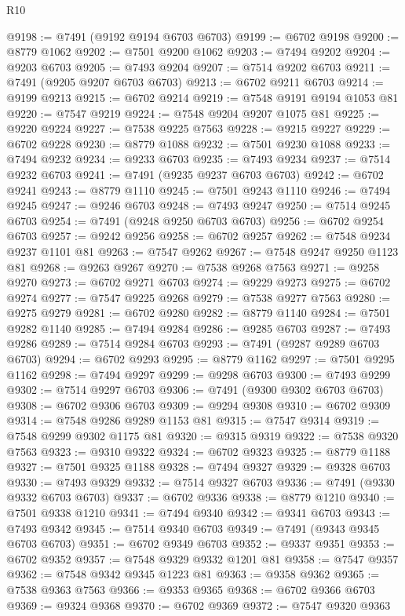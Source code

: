 \begin{lexlean}{R10}
\begin{coremodule}
{{{{{{{{{{{{{{{{{{{{{{{{{{{{{{{{{{{{{{{{{{{{{{{{{{{{{{{{{{{{{{{{{{{{{{{{{{{{{{{{{{{{@9198 := @7491 (@9192 @9194 @6703 @6703)
@9199 := @6702 @9198
@9200 := @8779 @1062
@9202 := @7501 @9200 @1062
@9203 := @7494 @9202
@9204 := @9203 @6703
@9205 := @7493 @9204
@9207 := @7514 @9202 @6703
@9211 := @7491 (@9205 @9207 @6703 @6703)
@9213 := @6702 @9211 @6703
@9214 := @9199 @9213
@9215 := @6702 @9214
@9219 := @7548 @9191 @9194 @1053 @81
@9220 := @7547 @9219
@9224 := @7548 @9204 @9207 @1075 @81
@9225 := @9220 @9224
@9227 := @7538 @9225 @7563
@9228 := @9215 @9227
@9229 := @6702 @9228
@9230 := @8779 @1088
@9232 := @7501 @9230 @1088
@9233 := @7494 @9232
@9234 := @9233 @6703
@9235 := @7493 @9234
@9237 := @7514 @9232 @6703
@9241 := @7491 (@9235 @9237 @6703 @6703)
@9242 := @6702 @9241
@9243 := @8779 @1110
@9245 := @7501 @9243 @1110
@9246 := @7494 @9245
@9247 := @9246 @6703
@9248 := @7493 @9247
@9250 := @7514 @9245 @6703
@9254 := @7491 (@9248 @9250 @6703 @6703)
@9256 := @6702 @9254 @6703
@9257 := @9242 @9256
@9258 := @6702 @9257
@9262 := @7548 @9234 @9237 @1101 @81
@9263 := @7547 @9262
@9267 := @7548 @9247 @9250 @1123 @81
@9268 := @9263 @9267
@9270 := @7538 @9268 @7563
@9271 := @9258 @9270
@9273 := @6702 @9271 @6703
@9274 := @9229 @9273
@9275 := @6702 @9274
@9277 := @7547 @9225 @9268
@9279 := @7538 @9277 @7563
@9280 := @9275 @9279
@9281 := @6702 @9280
@9282 := @8779 @1140
@9284 := @7501 @9282 @1140
@9285 := @7494 @9284
@9286 := @9285 @6703
@9287 := @7493 @9286
@9289 := @7514 @9284 @6703
@9293 := @7491 (@9287 @9289 @6703 @6703)
@9294 := @6702 @9293
@9295 := @8779 @1162
@9297 := @7501 @9295 @1162
@9298 := @7494 @9297
@9299 := @9298 @6703
@9300 := @7493 @9299
@9302 := @7514 @9297 @6703
@9306 := @7491 (@9300 @9302 @6703 @6703)
@9308 := @6702 @9306 @6703
@9309 := @9294 @9308
@9310 := @6702 @9309
@9314 := @7548 @9286 @9289 @1153 @81
@9315 := @7547 @9314
@9319 := @7548 @9299 @9302 @1175 @81
@9320 := @9315 @9319
@9322 := @7538 @9320 @7563
@9323 := @9310 @9322
@9324 := @6702 @9323
@9325 := @8779 @1188
@9327 := @7501 @9325 @1188
@9328 := @7494 @9327
@9329 := @9328 @6703
@9330 := @7493 @9329
@9332 := @7514 @9327 @6703
@9336 := @7491 (@9330 @9332 @6703 @6703)
@9337 := @6702 @9336
@9338 := @8779 @1210
@9340 := @7501 @9338 @1210
@9341 := @7494 @9340
@9342 := @9341 @6703
@9343 := @7493 @9342
@9345 := @7514 @9340 @6703
@9349 := @7491 (@9343 @9345 @6703 @6703)
@9351 := @6702 @9349 @6703
@9352 := @9337 @9351
@9353 := @6702 @9352
@9357 := @7548 @9329 @9332 @1201 @81
@9358 := @7547 @9357
@9362 := @7548 @9342 @9345 @1223 @81
@9363 := @9358 @9362
@9365 := @7538 @9363 @7563
@9366 := @9353 @9365
@9368 := @6702 @9366 @6703
@9369 := @9324 @9368
@9370 := @6702 @9369
@9372 := @7547 @9320 @9363
}}}}}}}}}}}}}}}}}}}}}}}}}}}}}}}}}}}}}}}}}}}}}}}}}}}}}}}}}}}}}}}}}}}}}}}}}}}}}}}}}}}}
\end{coremodule}
\end{lexlean}
